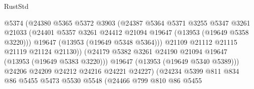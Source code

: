 \begin{lexlean}{RustStd}
\begin{coremodule}
                                      @5374
                                      (@24380
                                        @5365
                                        @5372
                                        @3903
                                        (@24387
                                          @5364
                                          @5371
                                          @3255
                                          @5347
                                          @3261
                                          @21033
                                          (@24401
                                            @5357
                                            @3261
                                            @24412
                                            @21094
                                            @19647
                                            (@13953 (@19649 @5358 @3220)))
                                          @19647
                                          (@13953 (@19649 @5348 @5364)))
                                        @21109
                                        @21112
                                        @21115
                                        @21119
                                        @21124
                                        @21130))
                                    (@24179
                                      @5382
                                      @3261
                                      @24190
                                      @21094
                                      @19647
                                      (@13953 (@19649 @5383 @3220)))
                                    @19647
                                    (@13953 (@19649 @5340 @5389)))
                                  @24206
                                  @24209
                                  @24212
                                  @24216
                                  @24221
                                  @24227)
                                (@24234
                                  @5399
                                  @811
                                  @834
                                  @86
                                  @5455
                                  @5473
                                  @5530
                                  @5548
                                  (@24466
                                    @799
                                    @810
                                    @86
                                    @5455

\end{coremodule}
\end{lexlean}
